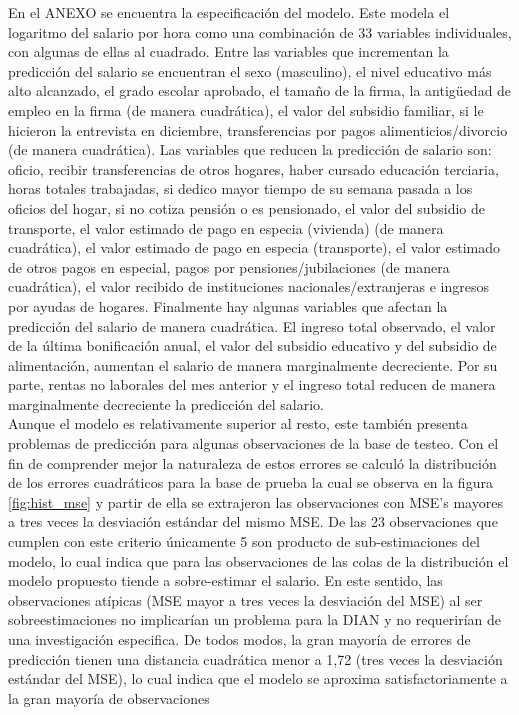 \documentclass[12pt]{article}
\begin{document}
En el ANEXO se encuentra la especificación del modelo. Este modela el logaritmo del salario por hora como una combinación de 33 variables individuales, con algunas de ellas al cuadrado. Entre las variables que incrementan la predicción del salario se encuentran el sexo (masculino), el nivel educativo más alto alcanzado, el grado escolar aprobado, el tamaño de la firma, la antigüedad de empleo en la firma (de manera cuadrática), el valor del subsidio familiar, si le hicieron la entrevista en diciembre, transferencias por pagos alimenticios/divorcio (de manera cuadrática). Las variables que reducen la predicción de salario son: oficio, recibir transferencias de otros hogares, haber cursado educación terciaria, horas totales trabajadas, si dedico mayor tiempo de su semana pasada a los oficios del hogar, si no cotiza pensión o es pensionado, el valor del subsidio de transporte, el valor estimado de pago en especia (vivienda) (de manera cuadrática), el valor estimado de pago en especia (transporte), el valor estimado de otros pagos en especial, pagos por pensiones/jubilaciones (de manera cuadrática), el valor recibido de instituciones nacionales/extranjeras e ingresos por ayudas de hogares. Finalmente hay algunas variables que afectan la predicción del salario de manera cuadrática. El ingreso total observado, el valor de la última bonificación anual, el valor del subsidio educativo y del subsidio de alimentación, aumentan el salario de manera marginalmente decreciente. Por su parte, rentas no laborales del mes anterior y el ingreso total reducen de manera marginalmente decreciente la predicción del salario. \\



Aunque el modelo es relativamente superior al resto, este también presenta problemas de predicción para algunas observaciones de la base de testeo. Con el fin de comprender mejor la naturaleza de estos errores se calculó la distribución de los errores cuadráticos para la base de prueba la cual se observa en la figura \ref{fig:hist_mse} y partir de ella se extrajeron las observaciones con MSE’s mayores a tres veces la desviación estándar del mismo MSE. De las 23 observaciones que cumplen con este criterio únicamente 5 son producto de sub-estimaciones del modelo, lo cual indica que para las observaciones de las colas de la distribución el modelo propuesto tiende a sobre-estimar el salario. En este sentido, las observaciones atípicas (MSE mayor a tres veces la desviación del MSE) al ser sobreestimaciones no implicarían un problema para la DIAN y no requerirían de una investigación especifica. De todos modos, la gran mayoría de errores de predicción tienen una distancia cuadrática menor a 1,72 (tres veces la desviación estándar del MSE), lo cual indica que el modelo se aproxima satisfactoriamente a la gran mayoría de observaciones \\
\end{document}

